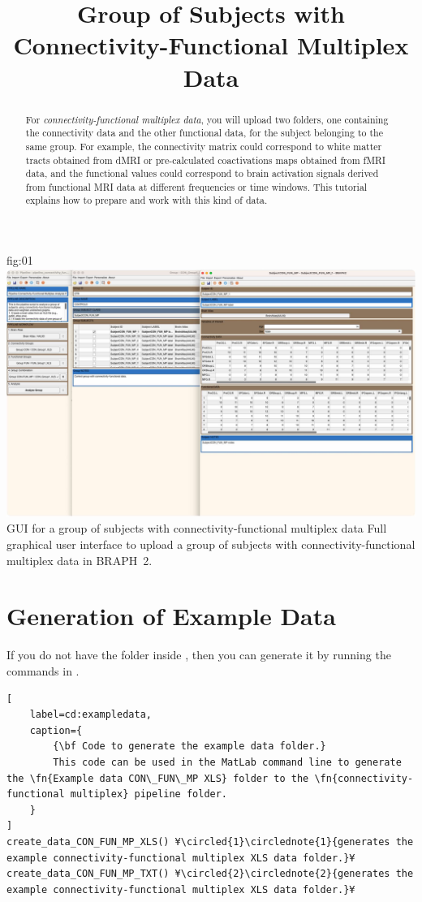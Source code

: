 \documentclass[justified]{tufte-handout}
\title{Group of Subjects with Connectivity-Functional Multiplex Data}
\begin{document}
\maketitle

\begin{abstract}
\noindent
For \emph{connectivity-functional multiplex data}, you will upload two folders, one containing the connectivity data and the other functional data, for the subject belonging to the same group. For example, the connectivity matrix could correspond to white matter tracts obtained from dMRI or pre-calculated coactivations maps obtained from fMRI data, and the functional values could correspond to brain activation signals derived from functional MRI data at different frequencies or time windows. This tutorial explains how to prepare and work with this kind of data.
\end{abstract}


\tableofcontents

	{fig:01}
	{\includegraphics{fig01.jpg}}
	{GUI for a group of subjects with connectivity-functional multiplex data}
	{
	Full graphical user interface to upload a group of subjects with connectivity-functional multiplex data in BRAPH~2. 
	}

\clearpage
\section{Generation of Example Data}

If you do not have the  folder inside , then you can generate it by running the commands in .

\begin{lstlisting}[
	label=cd:exampledata,
	caption={
		{\bf Code to generate the example data folder.}
		This code can be used in the MatLab command line to generate the \fn{Example data CON\_FUN\_MP XLS} folder to the \fn{connectivity-functional multiplex} pipeline folder.
	}
]
create_data_CON_FUN_MP_XLS() ¥\circled{1}\circlednote{1}{generates the example connectivity-functional multiplex XLS data folder.}¥
create_data_CON_FUN_MP_TXT() ¥\circled{2}\circlednote{2}{generates the example connectivity-functional multiplex XLS data folder.}¥
\end{lstlisting}
\end{document}
